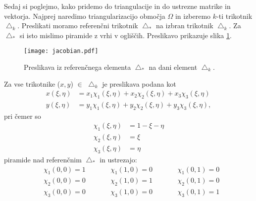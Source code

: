 \documentclass[12pt,a4paper]{article}
\begin{document}
Sedaj si poglejmo, kako pridemo do triangulacije in do ustrezne matrike in vektorja. Najprej naredimo triangularizacijo območja $\Omega$ in izberemo $k$-ti trikotnik $\bigtriangleup _k$. Preslikati moramo referenčni trikotnik $\bigtriangleup _*$ na izbran trikotnik $\bigtriangleup _k$. Za $\bigtriangleup _*$ si isto mislimo piramide z vrhi v ogliščih.  Preslikavo prikazuje slika \ref{fig:slika2}.

\begin{figure}[H]
\begin{center}
\texttt{[image: jacobian.pdf]}
\caption{Preslikava iz referenčnega elementa $\bigtriangleup _*$ na dani element $\bigtriangleup _k$.} \label{fig:slika2}
\end{center}
\end{figure} 

\noindent Za vse trikotnike ($x,y$) $\in$ $\bigtriangleup _k$ je preslikava podana kot
\begin{align} \label{eq:enacba9}
x(\xi, \eta)&= x_1 \chi_1(\xi, \eta) + x_2 \chi _2 (\xi, \eta) + x_3 \chi_3 (\xi, \eta) \nonumber \\
y(\xi, \eta)&= y_1 \chi_1(\xi, \eta) + y_2 \chi _2 (\xi, \eta) + y_3 \chi_3 (\xi, \eta),
\end{align}
pri čemer so
\begin{align*}
\chi_1(\xi, \eta)&= 1- \xi - \eta \\
\chi_2(\xi, \eta)&= \xi \\
\chi_3(\xi, \eta)&= \eta
\end{align*}
piramide nad referenčnim $\bigtriangleup _*$ in ustrezajo:
\begin{align*}
&\chi_1(0,0)= 1 &\qquad &\chi_1(1,0)= 0 &\qquad &\chi_1(0,1)= 0 \\
&\chi_2(0,0)= 0 &\qquad &\chi_2(1,0)= 1 &\qquad &\chi_2(0,1)= 0 \\
&\chi_3(0,0)= 0 &\qquad &\chi_3(1,0)= 0 &\qquad &\chi_3(0,1)= 1
\end{align*}
\end{document}
